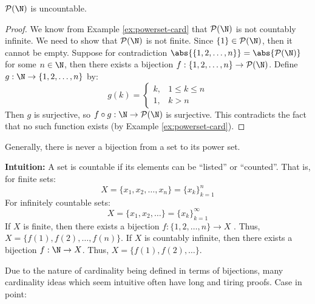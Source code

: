\begin{thmbox}{$\mathcal{P}(\N)$ is uncountable.}{}
    \begin{proof}
        We know from Example \ref{ex:powerset-card} that $\mathcal{P}(\N)$ is not countably infinite. We need to show that $\mathcal{P}(\N)$ is not finite. Since $\{1\} \in \mathcal{P}(\N)$, then it cannot be empty. Suppose for contradiction $\abs{\{1,2,\ldots,n\}} = \abs{\mathcal{P}(\N)}$ for some $n \in \N$, then there exists a bijection $f : \{1,2,\ldots,n\} \to \mathcal{P}(\N)$. Define $g : \N \to \{1,2,\ldots,n\}$ by:
        \[ g(k) = \begin{cases} k, & 1\leq k \leq n \\ 1, & k > n \end{cases} \]
        Then $g$ is surjective, so $f \circ g : \N \to \mathcal{P}(\N)$ is surjective. This contradicts the fact that no such function exists (by Example \ref{ex:powerset-card}).
    \end{proof}
\end{thmbox}

Generally, there is never a bijection from a set to its power set.

\begin{notebox}
    \textbf{Intuition:} A set is countable if its elements can be ``listed'' or ``counted''. That is, for finite sets:
    \[ X = \{x_1, x_2, \ldots, x_n\} = \{x_k\}_{k=1}^{n}\]
    For infinitely countable sets:
    \[ X = \{x_1, x_2, \ldots \} = \{x_k\}_{k=1}^\infty \]
    If $X$ is finite, then there exists a bijection $f : \{1,2,\ldots,n\} \to X$ . Thus, $X = \{f(1), f(2), \ldots, f(n) \}$. If $X$ is countably infinite, then there exists a bijection $f : \N \to X$. Thus, $X = \{f(1), f(2), \ldots\}$.
\end{notebox}

Due to the nature of cardinality being defined in terms of bijections, many cardinality ideas which seem intuitive often have long and tiring proofs. Case in point:

